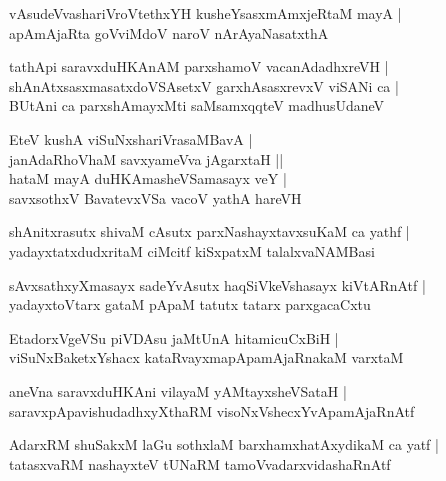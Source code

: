 \documentclass[twoside,12pt,openright]{book}
\newcounter{shloka}[chapter]
\begin{document}
\begin{shloka}%
vAsudeVvashariVroVtethxYH kusheYsasxmAmxjeRtaM mayA |\\
apAmAjaRta goVviMdoV naroV nArAyaNasatxthA 
\end{shloka}

\begin{shloka}%
tathApi saravxduHKAnAM parxshamoV vacanAdadhxreVH |\\
shAnAtxsasxmasatxdoVSAsetxV garxhAsasxrevxV viSANi ca |\\
BUtAni ca parxshAmayxMti saMsamxqqteV madhusUdaneV
\end{shloka}

\begin{shloka}%
EteV kushA viSuNxshariVrasaMBavA |\\
janAdaRhoVhaM savxyameVva jAgarxtaH ||\\
hataM mayA duHKAmasheVSamasayx veY |\\
savxsothxV BavatevxVSa vacoV yathA hareVH 
\end{shloka}

\begin{shloka}%
shAnitxrasutx shivaM cAsutx parxNashayxtavxsuKaM ca yathf |\\
yadayxtatxdudxritaM ciMcitf kiSxpatxM talalxvaNAMBasi
\end{shloka}

\begin{shloka}%
sAvxsathxyXmasayx sadeYvAsutx haqSiVkeVshasayx kiVtARnAtf |\\
yadayxtoVtarx gataM pApaM tatutx tatarx parxgacaCxtu
\end{shloka}

\begin{shloka}%
EtadorxVgeVSu piVDAsu jaMtUnA hitamicuCxBiH |\\
viSuNxBaketxYshacx kataRvayxmapApamAjaRnakaM varxtaM 
\end{shloka}

\begin{shloka}%
aneVna saravxduHKAni vilayaM yAMtayxsheVSataH |\\
saravxpApavishudadhxyXthaRM visoNxVshecxYvApamAjaRnAtf 
\end{shloka}

\begin{shloka}%
AdarxRM shuSakxM laGu sothxlaM barxhamxhatAxydikaM ca yatf |\\
tatasxvaRM nashayxteV tUNaRM tamoVvadarxvidashaRnAtf 
\end{shloka}
\end{document}
